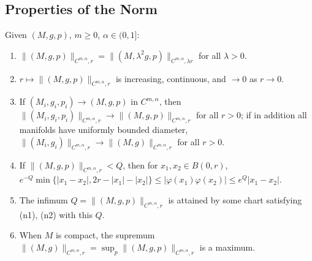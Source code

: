 \subsection{Properties of the Norm}

\begin{proposition}
  \label{prop:pet-ch11-norm-properties}
  Given $(M,g,p)$, $m\ge0$, $\alpha\in(0,1]$:
  \begin{enumerate}
  \item[(1)] $\|(M,g,p)\|_{C^{m,\alpha},r}=\|(M,\lambda^2g,p)\|_{C^{m,\alpha},\lambda r}$ for all $\lambda>0$.
  \item[(2)] $r\mapsto\|(M,g,p)\|_{C^{m,\alpha},r}$ is increasing, continuous, and $\to0$ as $r\to0$.
  \item[(3)] If $(M_i,g_i,p_i)\to(M,g,p)$ in $C^{m,\alpha}$, then
    $\|(M_i,g_i,p_i)\|_{C^{m,\alpha},r}\to\|(M,g,p)\|_{C^{m,\alpha},r}$ for all $r>0$;
    if in addition all manifolds have uniformly bounded diameter,
    $\|(M_i,g_i)\|_{C^{m,\alpha},r}\to\|(M,g)\|_{C^{m,\alpha},r}$ for all $r>0$.
  \item[(4)] If $\|(M,g,p)\|_{C^{m,\alpha},r}<Q$, then for $x_1,x_2\in B(0,r)$,
    $e^{-Q}\min\{|x_1-x_2|,2r-|x_1|-|x_2|\}\le|\varphi(x_1)\varphi(x_2)|\le e^Q|x_1-x_2|$.
  \item[(5)] The infimum $Q=\|(M,g,p)\|_{C^{m,\alpha},r}$ is attained by some
    chart satisfying (n1), (n2) with this $Q$.
  \item[(6)] When $M$ is compact, the supremum $\|(M,g)\|_{C^{m,\alpha},r}=\sup_p\|(M,g,p)\|_{C^{m,\alpha},r}$ is a maximum.
  \end{enumerate}
\end{proposition}
